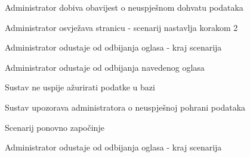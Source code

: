 \begin{packed_item}
\begin{packed_item}
\begin{packed_enum}
								\item Administrator dobiva obavijest o neuspješnom dohvatu podataka
								\item
									\begin{packed_enum}
										\item Administrator osvježava stranicu - scenarij nastavlja korakom 2
										\item Administrator odustaje od odbijanja oglasa - kraj scenarija
									\end{packed_enum}	
							\end{packed_enum}
							\item[5.a] Administrator odustaje od odbijanja navedenog oglasa
							\item[6.a] Sustav ne uspije ažurirati podatke u bazi
							\item[] \begin{packed_enum}
								\item Sustav upozorava administratora o neuspješnoj pohrani podataka 
								\item
									\begin{packed_enum}
										\item Scenarij ponovno započinje
										\item Administrator odustaje od odbijanja oglasa - kraj scenarija
									\end{packed_enum}
								\end{packed_enum}					
						\end{packed_item}
					\end{packed_item}

